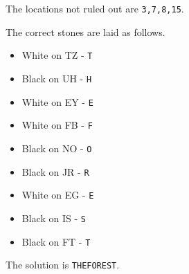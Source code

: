 

The locations not ruled out are \texttt{3,7,8,15}.


The correct stones are laid as follows.

\begin{multicols}{3}
\begin{itemize}
  \item White on TZ - \texttt{T}
  \item Black on UH - \texttt{H}
  \item White on EY - \texttt{E}
  \item White on FB - \texttt{F}
  \item Black on NO - \texttt{O}
  \item Black on JR - \texttt{R}
  \item White on EG - \texttt{E}
  \item Black on IS - \texttt{S}
  \item Black on FT - \texttt{T}
\end{itemize}
\end{multicols}

The solution is \texttt{THEFOREST}.




